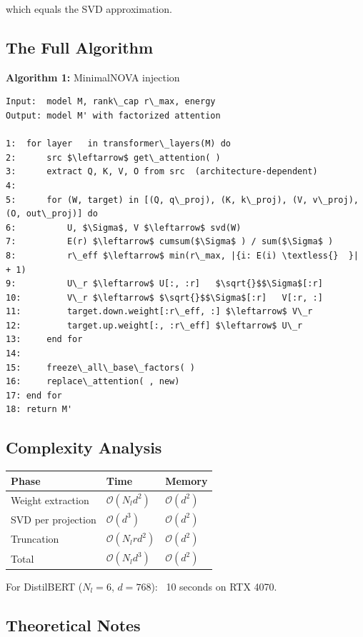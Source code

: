 which equals the SVD approximation.

\subsection{The Full Algorithm}

\textbf{Algorithm 1:} MinimalNOVA injection
\begin{lstlisting}
Input:  model M, rank\_cap r\_max, energy  
Output: model M' with factorized attention

1:  for layer   in transformer\_layers(M) do
2:      src $\leftarrow$ get\_attention( )
3:      extract Q, K, V, O from src  (architecture-dependent)
4:
5:      for (W, target) in [(Q, q\_proj), (K, k\_proj), (V, v\_proj), (O, out\_proj)] do
6:          U, $\Sigma$, V $\leftarrow$ svd(W)
7:          E(r) $\leftarrow$ cumsum($\Sigma$ ) / sum($\Sigma$ )
8:          r\_eff $\leftarrow$ min(r\_max, |{i: E(i) \textless{}  }| + 1)
9:          U\_r $\leftarrow$ U[:, :r]   $\sqrt{}$$\Sigma$[:r]
10:         V\_r $\leftarrow$ $\sqrt{}$$\Sigma$[:r]   V[:r, :]
11:         target.down.weight[:r\_eff, :] $\leftarrow$ V\_r
12:         target.up.weight[:, :r\_eff] $\leftarrow$ U\_r
13:     end for
14:
15:     freeze\_all\_base\_factors( )
16:     replace\_attention( , new)
17: end for
18: return M'
\end{lstlisting}

\subsection{Complexity Analysis}

\begin{table}[H]
\centering
\small
\begin{tabular}{lll}
\toprule
\textbf{Phase} & \textbf{Time} & \textbf{Memory} \\
\midrule
Weight extraction & $\mathcal{O}(N_l d^2)$ & $\mathcal{O}(d^2)$ \\
SVD per projection & $\mathcal{O}(d^3)$ & $\mathcal{O}(d^2)$ \\
Truncation & $\mathcal{O}(N_l r d^2)$ & $\mathcal{O}(d^2)$ \\
Total & $\mathcal{O}(N_l d^3)$ & $\mathcal{O}(d^2)$ \\
\bottomrule
\end{tabular}
\end{table}

For DistilBERT ($N_l = 6$, $d = 768$): ~10 seconds on RTX 4070.

\subsection{Theoretical Notes}

